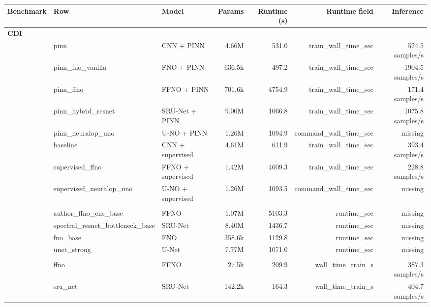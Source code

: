 \begin{tabular}{lllrrrr}
\toprule
Benchmark & Row & Model & Params & Runtime (s) & Runtime field & Inference \\
\midrule
\multicolumn{7}{l}{\textbf{CDI}} \\
 & pinn & CNN + PINN & 4.66M & 531.0 & train\_wall\_time\_sec & 524.5 samples/s \\
 & pinn\_fno\_vanilla & FNO + PINN & 636.5k & 497.2 & train\_wall\_time\_sec & 1904.5 samples/s \\
 & pinn\_ffno & FFNO + PINN & 701.6k & 4754.9 & train\_wall\_time\_sec & 171.4 samples/s \\
 & pinn\_hybrid\_resnet & SRU-Net + PINN & 9.00M & 1066.8 & train\_wall\_time\_sec & 1075.8 samples/s \\
 & pinn\_neuralop\_uno & U-NO + PINN & 1.26M & 1094.9 & command\_wall\_time\_sec & missing \\
 & baseline & CNN + supervised & 4.61M & 611.9 & train\_wall\_time\_sec & 393.4 samples/s \\
 & supervised\_ffno & FFNO + supervised & 1.42M & 4609.3 & train\_wall\_time\_sec & 228.8 samples/s \\
 & supervised\_neuralop\_uno & U-NO + supervised & 1.26M & 1093.5 & command\_wall\_time\_sec & missing \\
\addlinespace
\multicolumn{7}{l}{\textbf{PDEBench CNS}} \\
 & author\_ffno\_cns\_base & FFNO & 1.07M & 5103.3 & runtime\_sec & missing \\
 & spectral\_resnet\_bottleneck\_base & SRU-Net & 8.40M & 1436.7 & runtime\_sec & missing \\
 & fno\_base & FNO & 358.6k & 1129.8 & runtime\_sec & missing \\
 & unet\_strong & U-Net & 7.77M & 1071.0 & runtime\_sec & missing \\
\addlinespace
\multicolumn{7}{l}{\textbf{BRDT}} \\
 & ffno & FFNO & 27.5k & 209.9 & wall\_time\_train\_s & 387.3 samples/s \\
 & sru\_net & SRU-Net & 142.2k & 164.3 & wall\_time\_train\_s & 404.7 samples/s \\
\bottomrule
\end{tabular}
